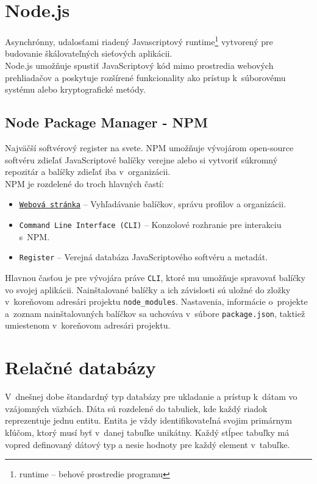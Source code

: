 \section{Node.js}
\label{theory:nodejs}
Asynchrónny, udalosťami riadený Javascriptový runtime\footnote{runtime -- behové prostredie programu} vytvorený pre budovanie škálovateľných sieťových aplikácii. \cite{NodeJS} \\

\noindent Node.js umožňuje spustiť JavaScriptový kód mimo prostredia webových prehliadačov a poskytuje rozšírené funkcionality ako prístup k~súborovému systému alebo kryptografické metódy.

\subsection{Node Package Manager - NPM}
Najväčší softvérový register na svete. NPM umožňuje vývojárom open-source softvéru zdieľať JavaScriptové balíčky verejne alebo si vytvoriť súkromný repozitár a balíčky zdieľať iba v~organizácii. \cite{NPM} \\

\noindent NPM je rozdelené do troch hlavných častí:
\begin{itemize}
	\item \texttt{\href{https://npmjs.com/}{Webová stránka}} -- Vyhľadávanie balíčkov, správu profilov a organizácii. \cite{NPM}
	\item \texttt{Command Line Interface (CLI)} -- Konzolové rozhranie pre interakciu s~NPM. \cite{NPM}
	\item \texttt{Register} -- Verejná databáza JavaScriptového softvéru a metadát. \cite{NPM}
\end{itemize}

\noindent Hlavnou časťou je pre vývojára práve \texttt{CLI}, ktoré mu umožňuje spravovať balíčky vo svojej aplikácii. Nainštalované balíčky a ich závislosti sú uložné do zložky v~koreňovom adresári projektu \texttt{node\_modules}. Nastavenia, informácie o~projekte a~zoznam nainštalovaných balíčkov sa uchováva v~súbore \texttt{package.json}, taktiež umiestenom v~koreňovom adresári projektu.

\section{Relačné databázy}
\label{theory:databases}
V~dnešnej dobe štandardný typ databázy pre ukladanie a prístup k~dátam vo vzájomných väzbách. Dáta sú rozdelené do tabuliek, kde každý riadok reprezentuje jednu entitu. Entita je vždy identifikovateľná svojim primárnym kľúčom, ktorý musí byť v~danej tabuľke unikátny. Každý stĺpec tabuľky má vopred definovaný dátový typ a nesie hodnoty pre každý element v~tabuľke. \\

